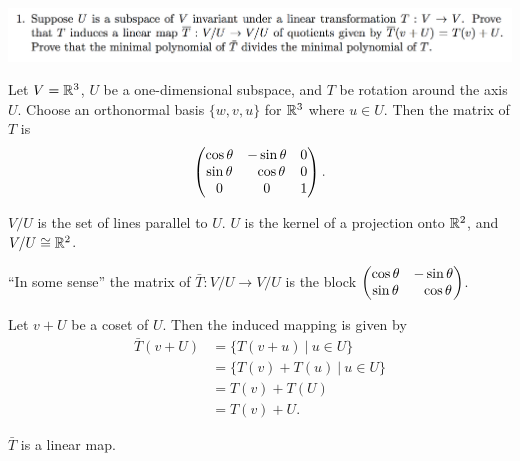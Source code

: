 \documentclass[12pt]{article}
\begin{document}
\begin{mdframed}
\includegraphics[width=400pt]{img/linear-algebra-a0-2-1.png}
\end{mdframed}
\begin{mdframed}
  \begin{example*}
    Let $V = \mathbb{R}^3$, $U$ be a one-dimensional subspace, and $T$ be rotation around the axis
    $U$. Choose an orthonormal basis $\{w, v, u\}$ for $\mathbb{R}^3$ where $u \in U$. Then the matrix
    of $T$ is
    \begin{align*}
      \begin{pmatrix}\cos\theta & -\sin\theta & 0\\\sin\theta & ~~\cos\theta & 0\\0 &            0 & 1\\ \end{pmatrix}.
    \end{align*}

    $V/U$ is the set of lines parallel to $U$. $U$ is the kernel of a projection onto $\mathbb{R}^2$, and
    $V/U \cong \mathbb{R}^2$.

    ``In some sense'' the matrix of $\bar T:V/U \to V/U$ is the block
    $\begin{pmatrix}\cos\theta & -\sin\theta\\\sin\theta & ~~\cos\theta\\ \end{pmatrix}$.
  \end{example*}
\end{mdframed}

Let $v + U$ be a coset of $U$. Then the induced mapping is given by
\begin{align*}
  \bar T(v + U) &= \{T(v + u) ~|~ u \in U\}\\
                &= \{T(v) + T(u) ~|~ u \in U\}\\
                &= T(v) + T(U)\\
                &= T(v) + U.
\end{align*}

\begin{claim*}
  $\bar T$ is a linear map.
\end{claim*}
\end{document}
